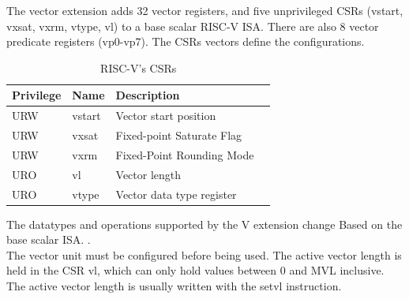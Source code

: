The vector extension adds 32 vector registers, and five unprivileged CSRs (vstart, vxsat, vxrm, vtype, vl) to a base scalar RISC-V ISA\cite{riscv-v-specs}.
There are also 8 vector predicate registers (vp0-vp7). The CSRs vectors define the configurations.

\begin{table}[H]
    \centering
    \begin{tabular}{|l|l|l|l|}
        \hline
        Privilege & Name   & Description               \\ \hline
        URW       & vstart & Vector start position     \\ \hline
        URW       & vxsat  & Fixed-point Saturate Flag \\ \hline
        URW       & vxrm   & Fixed-Point Rounding Mode \\ \hline
        URO       & vl     & Vector length             \\ \hline
        URO       & vtype  & Vector data type register \\ \hline
    \end{tabular}
    \caption{RISC-V's CSRs}
    \label{CSRs}
\end{table}

The datatypes and operations supported by the V extension change Based on the
base scalar ISA. \cite{riscv-v-specs}.\\


The vector unit must be conﬁgured before being used. 
The active vector length is held in the CSR vl, which can only hold values between 0 and MVL inclusive.
The active vector length is usually written with the setvl instruction.\\

